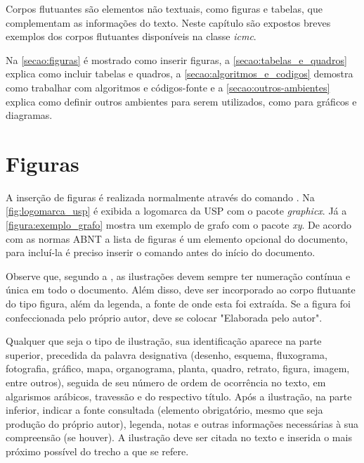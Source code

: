 Corpos flutuantes são elementos não textuais, como figuras e tabelas, que complementam as informações do texto. Neste capítulo são expostos breves exemplos dos corpos flutuantes disponíveis na classe \textit{icmc}.

Na \autoref{secao:figuras} é mostrado como inserir figuras, a \autoref{secao:tabelas_e_quadros} explica como incluir tabelas e quadros, a \autoref{secao:algoritmos_e_codigos} demostra como trabalhar com algoritmos e códigos-fonte e a \autoref{secao:outros-ambientes} explica como definir outros ambientes para serem utilizados, como para gráficos e diagramas.

\section{Figuras}
\label{secao:figuras}

A inserção de figuras é realizada normalmente através do comando . Na \autoref{fig:logomarca_usp} é exibida a logomarca da USP com o pacote \textit{graphicx}. Já a \autoref{figura:exemplo_grafo} mostra um exemplo de grafo com o pacote \textit{xy}. De acordo com as normas ABNT a lista de figuras é um elemento opcional do documento, para incluí-la é preciso inserir o comando  antes do início do documento.

Observe que, segundo a , as
ilustrações devem sempre ter numeração contínua e única em todo o documento. Além disso, deve ser incorporado ao corpo flutuante do tipo figura, além da legenda, a fonte de onde esta foi extraída. Se a figura foi confeccionada pelo próprio autor, deve se colocar "Elaborada pelo autor".

\begin{citacao}
Qualquer que seja o tipo de ilustração, sua identificação aparece na parte
superior, precedida da palavra designativa (desenho, esquema, fluxograma,
fotografia, gráfico, mapa, organograma, planta, quadro, retrato, figura,
imagem, entre outros), seguida de seu número de ordem de ocorrência no texto,
em algarismos arábicos, travessão e do respectivo título. Após a ilustração, na
parte inferior, indicar a fonte consultada (elemento obrigatório, mesmo que
seja produção do próprio autor), legenda, notas e outras informações
necessárias à sua compreensão (se houver). A ilustração deve ser citada no
texto e inserida o mais próximo possível do trecho a que se
refere. \cite[seções 5.8]{NBR14724:2011}
\end{citacao}

